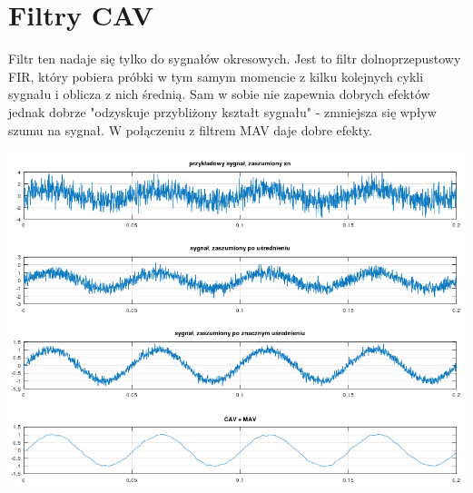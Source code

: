 \documentclass[11pt]{article}
\begin{document}
\section{Filtry CAV}
Filtr ten nadaje się tylko do sygnałów okresowych. Jest to filtr dolnoprzepustowy FIR, który pobiera próbki w tym samym momencie z kilku kolejnych cykli sygnału i oblicza z nich średnią. Sam w sobie nie zapewnia dobrych efektów jednak dobrze "odzyskuje przybliżony kształt sygnału" - zmniejsza się wpływ szumu na sygnał. W połączeniu z filtrem MAV daje dobre efekty.
\begin{center}
\includegraphics[width=15cm]{cav.png}
\end{center}
\end{document}
